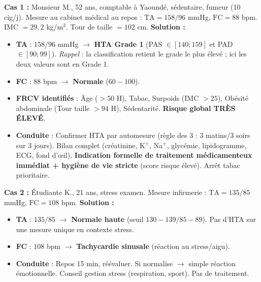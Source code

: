 \documentclass[11pt]{article}
\begin{document}
\begin{exoresolu}
\textbf{Cas 1 :} Monsieur M., 52 ans, comptable à Yaoundé, sédentaire, fumeur (10 cig/j). Mesure au cabinet médical au repos : $\text{TA} = 158/96$ mmHg, $\text{FC} = 88$ bpm. IMC $= 29,2$ kg/m$^2$. Tour de taille $= 102$ cm.
\textbf{Solution :}
\begin{itemize}
    \item \textbf{TA} : $158/96$ mmHg $\rightarrow$ \textbf{HTA Grade 1} (PAS $\in [140;159]$ et PAD $\in [90;99]$). \emph{Rappel} : la classification retient le grade le plus élevé ; ici les deux valeurs sont en Grade 1.
    \item \textbf{FC} : $88$ bpm $\rightarrow$ \textbf{Normale} ($60-100$).
    \item \textbf{FRCV identifiés} : Âge ($>50$ H), Tabac, Surpoids (IMC $>25$), Obésité abdominale (Tour taille $>94$ H), Sédentarité. \textbf{Risque global TRÈS ÉLEVÉ}.
    \item \textbf{Conduite} : Confirmer HTA par automesure (règle des 3 : 3 matins/3 soirs sur 3 jours). Bilan complet (créatinine, K$^+$, Na$^+$, glycémie, lipidogramme, ECG, fond d'œil). \textbf{Indication formelle de traitement médicamenteux immédiat + hygiène de vie stricte} (score risque élevé). Arrêt tabac prioritaire.
\end{itemize}

\textbf{Cas 2 :} Étudiante K., 21 ans, stress examen. Mesure infirmerie : $\text{TA} = 135/85$ mmHg, $\text{FC} = 108$ bpm.
\textbf{Solution :}
\begin{itemize}
    \item \textbf{TA} : $135/85$ $\rightarrow$ \textbf{Normale haute} (seuil $130-139 / 85-89$). Pas d'HTA sur une mesure unique en contexte stress.
    \item \textbf{FC} : $108$ bpm $\rightarrow$ \textbf{Tachycardie sinusale} (réaction au stress/aigu).
    \item \textbf{Conduite} : Repos 15 min, réévaluer. Si normalise $\rightarrow$ simple réaction émotionnelle. Conseil gestion stress (respiration, sport). Pas de traitement.
\end{itemize}


\end{exoresolu}
\end{document}
